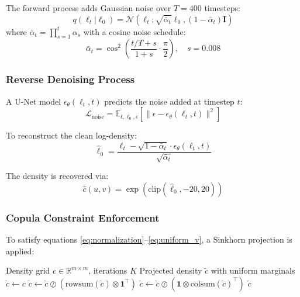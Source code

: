 \documentclass[11pt]{article}
\begin{document}
The forward process adds Gaussian noise over $T=400$ timesteps:
\begin{equation}
q(\ell_t | \ell_0) = \mathcal{N}(\ell_t; \sqrt{\bar{\alpha}_t} \ell_0, (1-\bar{\alpha}_t) \mathbf{I})
\end{equation}
where $\bar{\alpha}_t = \prod_{s=1}^t \alpha_s$ with a cosine noise schedule:
\begin{equation}
\bar{\alpha}_t = \cos^2\left(\frac{t/T + s}{1+s} \cdot \frac{\pi}{2}\right), \quad s = 0.008
\end{equation}

\subsubsection{Reverse Denoising Process}

A U-Net model $\epsilon_\theta(\ell_t, t)$ predicts the noise added at timestep $t$:
\begin{equation}
\mathcal{L}_{\text{noise}} = \mathbb{E}_{t, \ell_0, \epsilon} \left[ \|\epsilon - \epsilon_\theta(\ell_t, t)\|^2 \right]
\end{equation}

To reconstruct the clean log-density:
\begin{equation}
\hat{\ell}_0 = \frac{\ell_t - \sqrt{1-\bar{\alpha}_t} \cdot \epsilon_\theta(\ell_t, t)}{\sqrt{\bar{\alpha}_t}}
\end{equation}

The density is recovered via:
\begin{equation}
\hat{c}(u,v) = \exp(\text{clip}(\hat{\ell}_0, -20, 20))
\end{equation}

\subsubsection{Copula Constraint Enforcement}

To satisfy equations \eqref{eq:normalization}--\eqref{eq:uniform_v}, a Sinkhorn projection is applied:

\begin{algorithm}[H]
\caption{Sinkhorn Projection for Uniform Marginals}
\begin{algorithmic}[1]
\REQUIRE Density grid $c \in \mathbb{R}^{m \times m}$, iterations $K$
\ENSURE Projected density $\tilde{c}$ with uniform marginals
\STATE $\tilde{c} \gets c$
    \STATE $\tilde{c} \gets \tilde{c} \oslash (\text{rowsum}(\tilde{c}) \otimes \mathbf{1}^\top)$ 
    \STATE $\tilde{c} \gets \tilde{c} \oslash (\mathbf{1} \otimes \text{colsum}(\tilde{c})^\top)$ 
\ENDFOR
\RETURN $\tilde{c}$
\end{algorithmic}
\end{algorithm}
\end{document}
